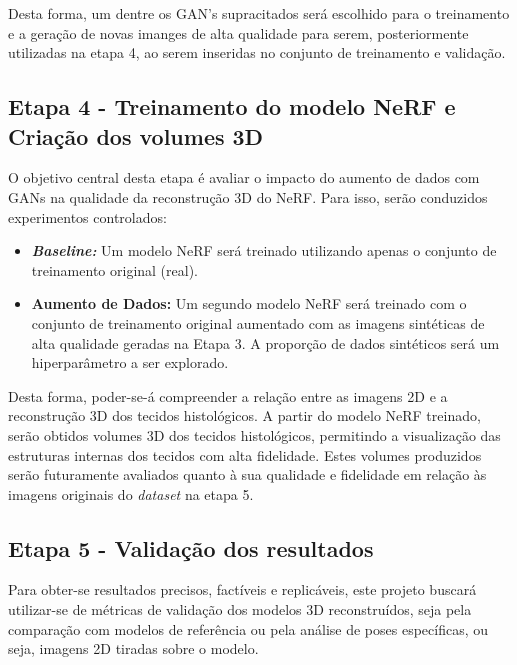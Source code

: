 Desta forma, um dentre os GAN's supracitados será escolhido para o treinamento e a geração de novas imanges de alta qualidade para serem, posteriormente utilizadas na etapa 4, ao serem inseridas no conjunto de treinamento e validação.


\subsection{Etapa 4 - Treinamento do modelo NeRF e Criação dos volumes 3D}

O objetivo central desta etapa é avaliar o impacto do aumento de dados com GANs na qualidade da reconstrução 3D do NeRF. Para isso, serão conduzidos experimentos controlados:

\begin{itemize}
  \item \textbf{\textit{Baseline:}} Um modelo NeRF será treinado utilizando apenas o conjunto de treinamento original (real).
\item \textbf{Aumento de Dados:} Um segundo modelo NeRF será treinado com o conjunto de treinamento original aumentado com as imagens sintéticas de alta qualidade geradas na Etapa 3. A proporção de dados sintéticos será um hiperparâmetro a ser explorado.
\end{itemize}

Desta forma, poder-se-á compreender a relação entre as imagens 2D e a reconstrução 3D dos tecidos histológicos. A partir do modelo NeRF treinado, serão obtidos volumes 3D dos tecidos histológicos, permitindo a visualização das estruturas internas dos tecidos com alta fidelidade. Estes volumes produzidos serão futuramente avaliados quanto à sua qualidade e fidelidade em relação às imagens originais do \textit{dataset} na etapa 5. 

\subsection{Etapa 5 - Validação dos resultados}

Para obter-se resultados precisos, factíveis e replicáveis, este projeto buscará utilizar-se de métricas de validação dos modelos 3D reconstruídos, seja pela comparação com modelos de referência ou pela análise de poses específicas, ou seja, imagens 2D tiradas sobre o modelo.


